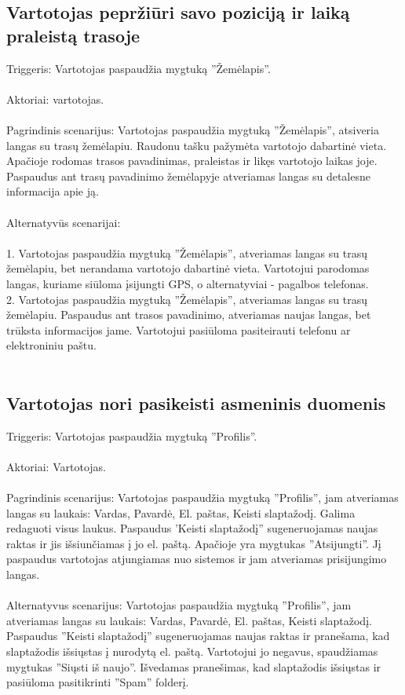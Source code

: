 \documentclass[oneside]{VUMIFPSkursinis}
\begin{document}
\subsection{Vartotojas pepržiūri savo poziciją ir laiką praleistą trasoje}
Triggeris: Vartotojas paspaudžia mygtuką ''Žemėlapis''.\\ \\
Aktoriai: vartotojas.\\ \\
Pagrindinis scenarijus: Vartotojas paspaudžia mygtuką ''Žemėlapis'', atsiveria langas su trasų žemėlapiu. Raudonu tašku pažymėta vartotojo dabartinė vieta. Apačioje rodomas trasos pavadinimas, praleistas ir likęs vartotojo laikas joje. Paspaudus ant trasų pavadinimo žemėlapyje atveriamas langas su detalesne informacija apie ją.\\ \\
Alternatyvūs scenarijai:  \\ \\
1. Vartotojas paspaudžia mygtuką ''Žemėlapis'', atveriamas langas su trasų žemėlapiu, bet nerandama vartotojo dabartinė vieta. Vartotojui parodomas langas, kuriame siūloma įsijungti GPS, o alternatyviai - pagalbos telefonas.\\
2. Vartotojas paspaudžia mygtuką ''Žemėlapis'', atveriamas langas su trasų žemėlapiu. Paspaudus ant trasos pavadinimo, atveriamas naujas langas, bet trūksta informacijos jame.  Vartotojui pasiūloma pasiteirauti telefonu ar elektroniniu paštu. \\ \\ 

\subsection{Vartotojas nori pasikeisti asmeninis duomenis}
Triggeris: Vartotojas paspaudžia mygtuką ''Profilis''. \\ \\
Aktoriai: Vartotojas.\\ \\
Pagrindinis scenarijus: Vartotojas paspaudžia mygtuką ''Profilis'', jam atveriamas langas su laukais: Vardas, Pavardė, El. paštas, Keisti slaptažodį. Galima redaguoti visus laukus. Paspaudus 'Keisti slaptažodį'' sugeneruojamas naujas raktas ir jis išsiunčiamas į jo el. paštą. Apačioje yra mygtukas ''Atsijungti''. Jį paspaudus vartotojas atjungiamas nuo sistemos ir jam atveriamas prisijungimo langas. \\ \\
Alternatyvus scenarijus: Vartotojas paspaudžia mygtuką ''Profilis'', jam atveriamas langas su laukais: Vardas, Pavardė, El. paštas, Keisti slaptažodį.  Paspaudus ''Keisti slaptažodį'' sugeneruojamas naujas raktas ir pranešama, kad slaptažodis išsiųstas į nurodytą el. paštą. Vartotojui jo negavus, spaudžiamas mygtukas ''Siųsti iš naujo''. Išvedamas pranešimas, kad slaptažodis išsiųstas ir pasiūloma pasitikrinti  ''Spam'' folderį. \\ \\ 
\end{document}
